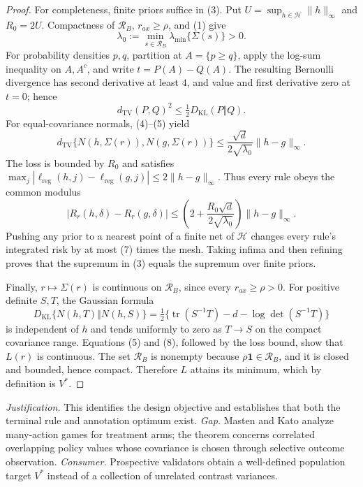 \documentclass{article}
\begin{document}
\begin{proof}
For completeness, finite priors suffice in (3).  Put \(U=\sup_{h\in\mathcal H}\lVert h\rVert_\infty\) and \(R_0=2U\).  Compactness of \(\mathcal R_B\), \(r_{ax}\geq\rho\), and (1) give
\[
 \lambda_0:=\min_{s\in\mathcal R_B}\lambda_{\min}\{\Sigma(s)\}>0. \tag{4}
\]
For probability densities \(p,q\), partition at \(A=\{p\geq q\}\), apply the log-sum inequality on \(A,A^c\), and write \(t=P(A)-Q(A)\).  The resulting Bernoulli divergence has second derivative at least \(4\), and value and first derivative zero at \(t=0\); hence
\[
 d_{\mathrm{TV}}(P,Q)^2\leq\tfrac12D_{\mathrm{KL}}(P\Vert Q).        \tag{5}
\]
For equal-covariance normals, (4)--(5) yield
\[
 d_{\mathrm{TV}}\{N(h,\Sigma(r)),N(g,\Sigma(r))\}
 \leq\frac{\sqrt d}{2\sqrt{\lambda_0}}\lVert h-g\rVert_\infty.    \tag{6}
\]
The loss is bounded by \(R_0\) and satisfies \(\max_j|\ell_{\mathrm{reg}}(h,j)-\ell_{\mathrm{reg}}(g,j)|\leq2\lVert h-g\rVert_\infty\).  Thus every rule obeys the common modulus
\[
 |R_r(h,\delta)-R_r(g,\delta)|
 \leq\left(2+\frac{R_0\sqrt d}{2\sqrt{\lambda_0}}\right)
 \lVert h-g\rVert_\infty.                                          \tag{7}
\]
Pushing any prior to a nearest point of a finite net of \(\mathcal H\) changes every rule's integrated risk by at most (7) times the mesh.  Taking infima and then refining proves that the supremum in (3) equals the supremum over finite priors.

Finally, \(r\mapsto\Sigma(r)\) is continuous on \(\mathcal R_B\), since every \(r_{ax}\geq\rho>0\).  For positive definite \(S,T\), the Gaussian formula
\[
 D_{\mathrm{KL}}\{N(h,T)\Vert N(h,S)\}
 =\tfrac12\{\operatorname{tr}(S^{-1}T)-d-\log\det(S^{-1}T)\}        \tag{8}
\]
is independent of \(h\) and tends uniformly to zero as \(T\to S\) on the compact covariance range.  Equations (5) and (8), followed by the loss bound, show that \(L(r)\) is continuous.  The set \(\mathcal R_B\) is nonempty because \(\rho\mathbf1\in\mathcal R_B\), and it is closed and bounded, hence compact.  Therefore \(L\) attains its minimum, which by definition is \(V^*\).
\end{proof}
\par\smallskip\noindent \textit{Justification.} This identifies the design objective and establishes that both the terminal rule and annotation optimum exist. \textit{Gap.} Masten and Kato analyze many-action games for treatment arms; the theorem concerns correlated overlapping policy values whose covariance is chosen through selective outcome observation. \textit{Consumer.} Prospective validators obtain a well-defined population target \(V^*\) instead of a collection of unrelated contrast variances.
\end{document}
